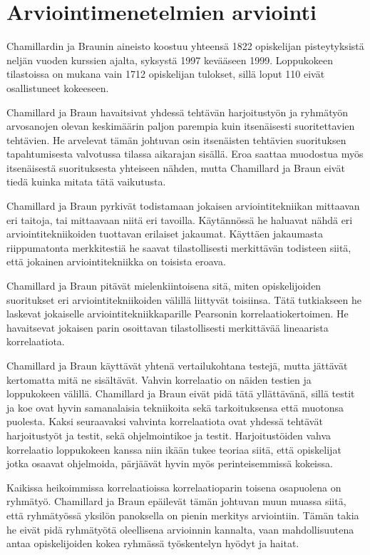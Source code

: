 \documentclass[finnish]{../tktltiki2}
\theoremstyle{definition}
\theoremstyle{remark}
\begin{document}
\section{Arviointimenetelmien arviointi}

Chamillardin ja Braunin aineisto koostuu yhteensä 1822 opiskelijan pisteytyksistä neljän vuoden kurssien ajalta, syksystä 1997 kevääseen 1999. Loppukokeen tilastoissa on mukana vain 1712 opiskelijan tulokset, sillä loput 110 eivät osallistuneet kokeeseen.

Chamillard ja Braun havaitsivat yhdessä tehtävän harjoitustyön ja ryhmä\-työn arvosanojen olevan keskimäärin paljon parempia kuin itsenäisesti suoritettavien tehtävien. He arvelevat tämän johtuvan osin itsenäisten tehtävien suorituksen tapahtumisesta valvotussa tilassa aikarajan sisällä. Eroa saattaa muodostua myös itsenäisestä suorituksesta yhteiseen nähden, mutta Chamillard ja Braun eivät tiedä kuinka mitata tätä vaikutusta.

Chamillard ja Braun pyrkivät todistamaan jokaisen arviointitekniikan mittaavan eri taitoja, tai mittaavaan niitä eri tavoilla. Käytännössä he haluavat nähdä eri arviointitekniikoiden tuottavan erilaiset jakaumat. Käyttäen jakaumasta riippumatonta merkkitestiä he saavat tilastollisesti merkittävän todisteen siitä, että jokainen arviointitekniikka on toisista eroava.

Chamillard ja Braun pitävät mielenkiintoisena sitä, miten opiskelijoiden suoritukset eri arviointitekniikoiden välillä liittyvät toisiinsa. Tätä tutkiakseen he laskevat jokaiselle arviointitekniikkaparille Pearsonin korrelaatiokertoimen. He havaitsevat jokaisen parin osoittavan tilastollisesti merkittävää lineaarista korrelaatiota.

Chamillard ja Braun käyttävät yhtenä vertailukohtana testejä, mutta jättävät kertomatta mitä ne sisältävät. Vahvin korrelaatio on näiden testien ja loppukokeen välillä. Chamillard ja Braun eivät pidä tätä yllättävänä, sillä testit ja koe ovat hyvin samanalaisia tekniikoita sekä tarkoituksensa että muotonsa puolesta. Kaksi seuraavaksi vahvinta korrelaatiota ovat yhdessä tehtävät harjoitustyöt ja testit, sekä ohjelmointikoe ja testit. Harjoitustöiden vahva korrelaatio loppukokeen kanssa niin ikään tukee teoriaa siitä, että opiskelijat jotka osaavat ohjelmoida, pärjäävät hyvin myös perinteisemmissä kokeissa.

Kaikissa heikoimmissa korrelaatioissa korrelaatioparin toisena osapuolena on ryhmätyö. Chamillard ja Braun epäilevät tämän johtuvan muun muassa siitä, että ryhmätyössä yksilön panoksella on pienin merkitys arviointiin. Tämän takia he eivät pidä ryhmätyötä oleellisena arvioinnin kannalta, vaan mahdollisuutena antaa opiskelijoiden kokea ryhmässä työskentelyn hyödyt ja haitat.
\end{document}

